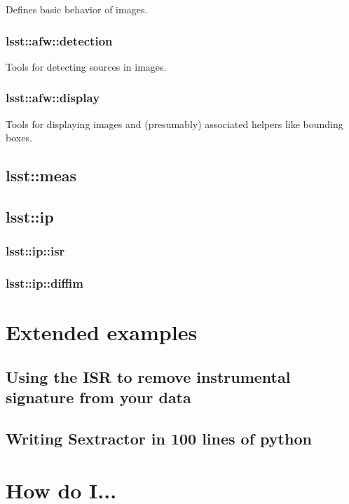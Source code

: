 \documentclass{book}
\begin{document}
Defines basic behavior of images.

\subsection{lsst::afw::detection}

Tools for detecting sources in images.

\subsection{lsst::afw::display}

Tools for displaying images and (presumably) associated helpers like
bounding boxes.

\section{lsst::meas}

\section{lsst::ip}

\subsection{lsst::ip::isr}

\subsection{lsst::ip::diffim}




\chapter{Extended examples}

\section{Using the ISR to remove instrumental signature from your data}

\section{Writing Sextractor in 100 lines of python}
 
\chapter{How do I...}
\end{document}
